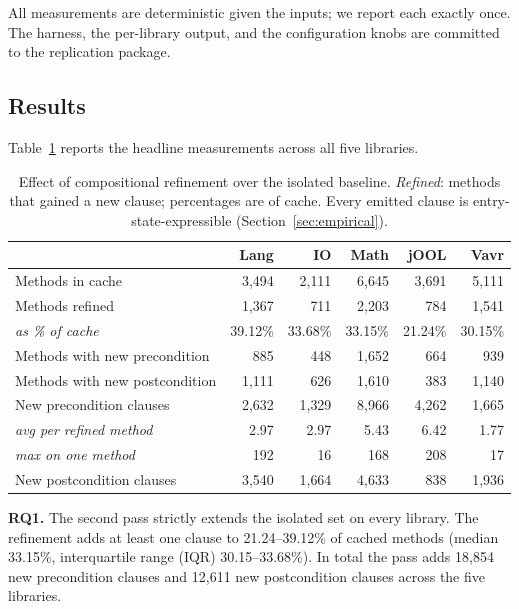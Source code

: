 All measurements are deterministic given the inputs; we report each
exactly once. The harness, the per-library output, and the
configuration knobs are committed to the replication package.

\subsection{Results}

Table~\ref{tab:headline} reports the headline measurements across
all five libraries.

\begin{table}[ht]
\centering
\small
\caption{Effect of compositional refinement over the isolated baseline. \emph{Refined}: methods that gained a new clause; percentages are of cache. Every emitted clause is entry-state-expressible (Section~\ref{sec:empirical}).}
\label{tab:headline}
\begin{tabular}{lrrrrr}
\toprule
& \textbf{Lang} & \textbf{IO} & \textbf{Math} & \textbf{jOOL} & \textbf{Vavr} \\
\midrule
Methods in cache             & 3{,}494 & 2{,}111 & 6{,}645 & 3{,}691 & 5{,}111 \\
\midrule
Methods refined              & 1{,}367 & 711     & 2{,}203 & 784     & 1{,}541 \\
\hspace{1em}\emph{as \% of cache} & 39.12\% & 33.68\% & 33.15\% & 21.24\% & 30.15\% \\
Methods with new precondition & 885 & 448    & 1{,}652 & 664     & 939 \\
Methods with new postcondition & 1{,}111 & 626   & 1{,}610 & 383     & 1{,}140 \\
\midrule
New precondition clauses     & 2{,}632  & 1{,}329 & 8{,}966 & 4{,}262 & 1{,}665 \\
\hspace{1em}\emph{avg per refined method} & 2.97 & 2.97 & 5.43 & 6.42 & 1.77 \\
\hspace{1em}\emph{max on one method} & 192   & 16 & 168 & 208 & 17 \\
New postcondition clauses    & 3{,}540  & 1{,}664 & 4{,}633 & 838 & 1{,}936 \\
\bottomrule
\end{tabular}
\end{table}

\textbf{RQ1.} The second pass strictly extends the isolated set on every library. The refinement adds at least one
clause to 21.24--39.12\% of cached methods (median 33.15\%,
interquartile range (IQR) 30.15--33.68\%). In total the pass adds 18{,}854 new precondition
clauses and 12{,}611 new postcondition clauses across the five
libraries.

